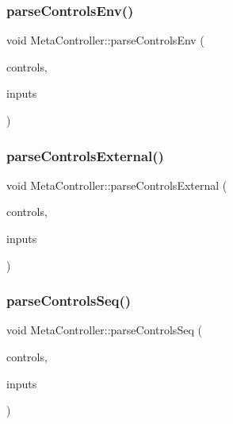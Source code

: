 \mbox{\label{class_meta_controller_a5f3e148b9730b47b9d3105d39dd88938}} 
\subsubsection{\texorpdfstring{parse\+Controls\+Env()}{parseControlsEnv()}}
{\footnotesize\ttfamily void Meta\+Controller\+::parse\+Controls\+Env (\begin{DoxyParamCaption}\item[{\mbox{\hyperlink{class_via_controls}{Via\+Controls}} $\ast$}]{controls,  }\item[{\mbox{\hyperlink{class_via_input_streams}{Via\+Input\+Streams}} $\ast$}]{inputs }\end{DoxyParamCaption})}

\mbox{\label{class_meta_controller_a04a33cca84424c10d37cddecb663f619}} 
\subsubsection{\texorpdfstring{parse\+Controls\+External()}{parseControlsExternal()}}
{\footnotesize\ttfamily void Meta\+Controller\+::parse\+Controls\+External (\begin{DoxyParamCaption}\item[{\mbox{\hyperlink{class_via_controls}{Via\+Controls}} $\ast$}]{controls,  }\item[{\mbox{\hyperlink{class_via_input_streams}{Via\+Input\+Streams}} $\ast$}]{inputs }\end{DoxyParamCaption})}

\mbox{\label{class_meta_controller_ac337c31f2c24c6a51684a44c8947e178}} 
\subsubsection{\texorpdfstring{parse\+Controls\+Seq()}{parseControlsSeq()}}
{\footnotesize\ttfamily void Meta\+Controller\+::parse\+Controls\+Seq (\begin{DoxyParamCaption}\item[{\mbox{\hyperlink{class_via_controls}{Via\+Controls}} $\ast$}]{controls,  }\item[{\mbox{\hyperlink{class_via_input_streams}{Via\+Input\+Streams}} $\ast$}]{inputs }\end{DoxyParamCaption})}

